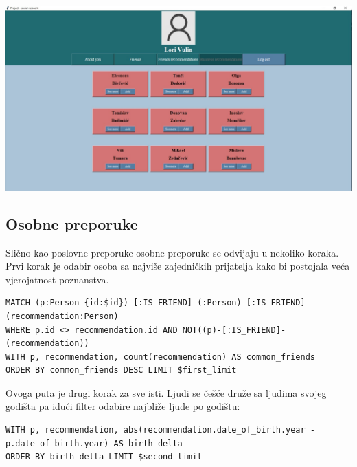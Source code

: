 \documentclass[titlepage, 12pt]{scrartcl}
\begin{document}
\begin{center}
    \includegraphics[scale=0.19]{slike/business.jpg}
\end{center}

\subsection{Osobne preporuke}
Slično kao poslovne preporuke osobne preporuke se odvijaju u nekoliko koraka. \\
Prvi korak je odabir osoba sa najviše zajedničkih prijatelja kako bi postojala veća vjerojatnost poznanstva.
\begin{samepage}
\begin{verbatim}
MATCH (p:Person {id:$id})-[:IS_FRIEND]-(:Person)-[:IS_FRIEND]-(recommendation:Person)
WHERE p.id <> recommendation.id AND NOT((p)-[:IS_FRIEND]-(recommendation))
WITH p, recommendation, count(recommendation) AS common_friends
ORDER BY common_friends DESC LIMIT $first_limit

\end{verbatim}
\end{samepage}
Ovoga puta je drugi korak za sve isti. Ljudi se češće druže sa ljudima svojeg godišta pa idući filter odabire najbliže ljude po godištu:
\begin{samepage}
\begin{verbatim}
WITH p, recommendation, abs(recommendation.date_of_birth.year - p.date_of_birth.year) AS birth_delta 
ORDER BY birth_delta LIMIT $second_limit

\end{verbatim}
\end{samepage}
\end{document}
